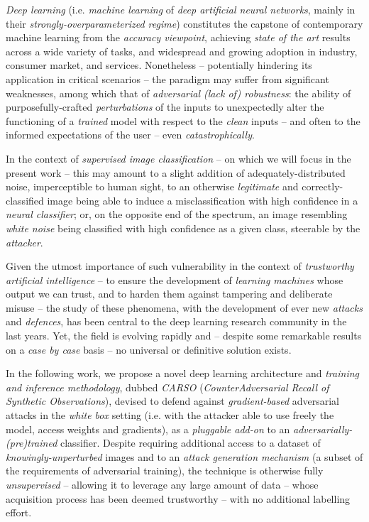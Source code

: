 

\textit{Deep learning} (i.e. \textit{machine learning} of \textit{deep artificial neural networks}, mainly in their \textit{strongly-overparameterized regime}) constitutes the capstone of contemporary machine learning from the \textit{accuracy viewpoint}, achieving \textit{state of the art}  results across a wide variety of tasks, and widespread and growing adoption in industry, consumer market, and services. Nonetheless – potentially hindering its application in critical scenarios – the paradigm may suffer from significant weaknesses, among which that of \textit{adversarial (lack of) robustness}: the ability of purposefully-crafted \textit{perturbations} of the inputs to unexpectedly alter the functioning of a \textit{trained} model with respect to the \textit{clean} inputs – and often to the informed expectations of the user – even \textit{catastrophically}.

In the context of \textit{supervised image classification} – on which we will focus in the present work – this may amount to a slight addition of adequately-distributed noise, imperceptible to human sight, to an otherwise \textit{legitimate} and correctly-classified image being able to induce a misclassification with high confidence in a \textit{neural classifier}; or, on the opposite end of the spectrum, an image resembling \textit{white noise} being classified with high confidence as a given class, steerable by the \textit{attacker}.

Given the utmost importance of such vulnerability in the context of \textit{trustworthy artificial intelligence} – to ensure the development of \textit{learning machines} whose output we can trust, and to harden them against tampering and deliberate misuse – the study of these phenomena, with the development of ever new \textit{attacks} and \textit{defences}, has been central to the deep learning research community in the last years. Yet, the field is evolving rapidly and – despite some remarkable results on a \textit{case by case} basis – no universal or definitive solution exists.

In the following work, we propose a novel deep learning architecture and \textit{training and inference methodology}, dubbed \textit{CARSO} (\textit{CounterAdversarial Recall of Synthetic Observations}), devised to defend against \textit{gradient-based} adversarial attacks in the \textit{white box} setting (i.e. with the attacker able to use freely the model, access weights and gradients), as a \textit{pluggable add-on} to an \textit{adversarially-(pre)trained} classifier. Despite requiring additional access to a dataset of \textit{knowingly-unperturbed} images and to an \textit{attack generation mechanism} (a subset of the requirements of adversarial training), the technique is otherwise fully \textit{unsupervised} – allowing it to leverage any large amount of data – whose acquisition process has been deemed trustworthy – with no additional labelling effort.

